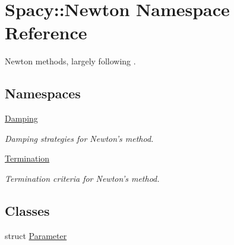 \hypertarget{namespaceSpacy_1_1Newton}{\section{Spacy\-:\-:Newton Namespace Reference}
\label{namespaceSpacy_1_1Newton}
}


Newton methods, largely following \cite{Deuflhard2004}.  


\subsection*{Namespaces}
\begin{DoxyCompactItemize}
\item 
\hyperlink{namespaceSpacy_1_1Newton_1_1Damping}{Damping}
\begin{DoxyCompactList}\small\item\em Damping strategies for Newton's method. \end{DoxyCompactList}\item 
\hyperlink{namespaceSpacy_1_1Newton_1_1Termination}{Termination}
\begin{DoxyCompactList}\small\item\em Termination criteria for Newton's method. \end{DoxyCompactList}\end{DoxyCompactItemize}
\subsection*{Classes}
\begin{DoxyCompactItemize}
\item 
struct \hyperlink{structSpacy_1_1Newton_1_1Parameter}{Parameter}
\end{DoxyCompactItemize}

